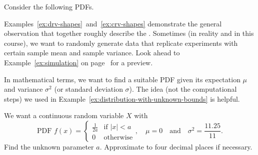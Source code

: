 \documentclass[../main.tex]{subfiles}
\begin{document}
\begin{example} \label{ex:crv-shapes}
  Consider the following PDFs.

  \begin{center}

  \end{center}
\end{example}
\clearpage

Examples~\ref{ex:drv-shapes}~and~\ref{ex:crv-shapes} demonstrate the general observation that  together roughly describe the .  Sometimes (in reality and in this course), we want to randomly generate data that replicate experiments with certain sample mean and sample variance.  Look ahead to Example~\ref{ex:simulation} on page~\pageref{ex:simulation} for a preview.

In mathematical terms, we want to find a suitable PDF given its expectation \(\mu\) and variance \(\sigma^{2}\) (or standard deviation \(\sigma\)). The idea (not the computational steps) we used in Example~\ref{ex:distribution-with-unknown-bounds} is helpful.

\begin{example} \label{ex:uniform-distribution-from-mean-and-stddev}
  We want a continuous random variable \(X\) with 
  \[
    \text{PDF }
    f(x) = 
    \begin{cases}
      \frac{1}{2a} & \text{if } |x| < a \\
      0 & \text{otherwise}
    \end{cases},
    \quad
    \mu = 0 \quad\text{and}\quad \sigma^{2} = \frac{11.25}{11}.
  \]
  Find the unknown parameter \(a\). Approximate to four decimal places if necessary.

\end{example}
\clearpage
\end{document}
